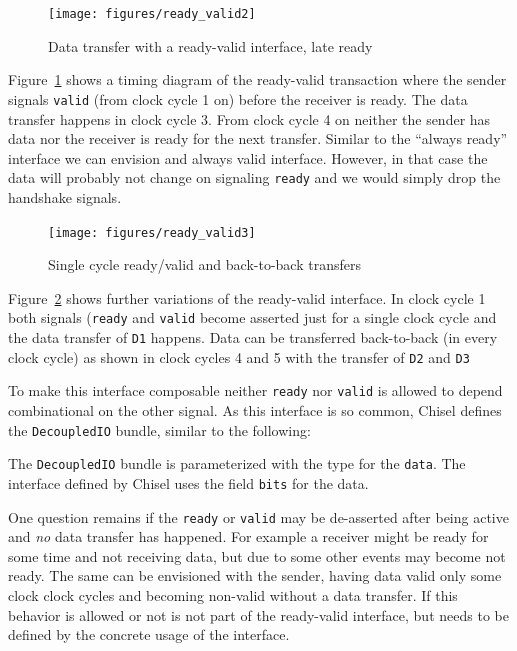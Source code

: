 \documentclass[%
    10pt,
    headinclude, footexclude,
    openright, %
    notitlepage,
    cleardoubleempty,
    headsepline,
    pointlessnumbers,
    bibtotoc, idxtotoc,
    ]{scrbook}
\newcommand{\code}[1]{{\small{\texttt{#1}}}}
\begin{document}
\begin{figure}
  \centering
  \texttt{[image: figures/ready\_valid2]}
  \caption{Data transfer with a ready-valid interface, late ready}
  \label{fig:ready_valid2}
\end{figure}

Figure~\ref{fig:ready_valid2} shows a timing diagram of the ready-valid
transaction where the sender signals \code{valid} (from clock cycle 1 on)
before the receiver is ready. The data transfer happens in clock cycle 3.
From clock cycle 4 on neither the sender has data nor the receiver is ready
for the next transfer.
Similar to the ``always ready'' interface we can envision and always valid
interface. However, in that case the data will probably not change on signaling
\code{ready} and we would simply drop the handshake signals.

\begin{figure}
  \centering
  \texttt{[image: figures/ready\_valid3]}
  \caption{Single cycle ready/valid and back-to-back transfers}
  \label{fig:ready_valid3}
\end{figure}

Figure~\ref{fig:ready_valid3} shows further variations of the ready-valid
interface. In clock cycle 1 both signals (\code{ready} and \code{valid}
become asserted just for a single clock cycle and the data transfer
of \code{D1} happens. Data can be transferred back-to-back (in every
clock cycle) as shown in clock cycles 4 and 5 with the transfer of
\code{D2} and \code{D3}

To make this interface composable neither \code{ready} nor \code{valid} is
allowed to depend combinational on the other signal.
As this interface is so common, Chisel defines the \code{DecoupledIO}
bundle, similar to the following:


\noindent The \code{DecoupledIO} bundle is parameterized with the type for
the \code{data}. The interface defined by Chisel uses the field \code{bits}
for the data.

One question remains if the \code{ready} or \code{valid} may be de-asserted
after being active and \emph{no} data transfer has happened.
For example a receiver might be ready for some time and not receiving data, but
due to some other events may become not ready.
The same can be envisioned with the sender, having data valid only some clock
clock cycles and becoming non-valid without a data transfer.
If this behavior is allowed or not is not part of the ready-valid interface,
but needs to be defined by the concrete usage of the interface.
\end{document}
